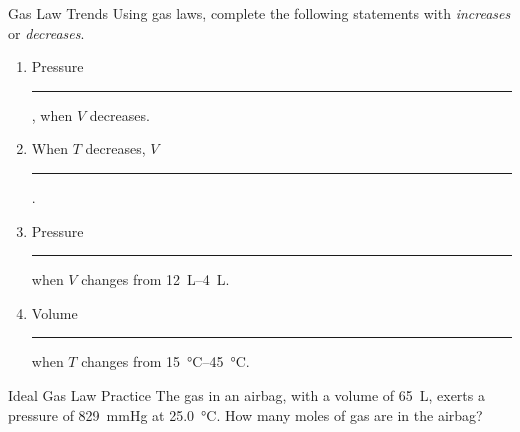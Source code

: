 \documentclass[handout]{beamer}
\begin{document}
\begin{frame}[t]{Gas Law Trends}
	Using gas laws, complete the following statements with \emph{increases}
	or \emph{decreases}.

	\begin{enumerate}
		\item Pressure \rule{6em}{0.4pt}, when $V$ decreases.
		\item When $T$ decreases, $V$ \rule{6em}{0.4pt}.
		\item Pressure \rule{6em}{0.4pt} when $V$ changes from
			\SIrange{12}{4}{\liter}.
		\item Volume \rule{6em}{0.4pt} when $T$ changes from
			\SIrange{15}{45}{\celsius}.
	\end{enumerate}
\end{frame}



\begin{frame}[t]{Ideal Gas Law Practice }
	The  gas in an airbag, with a volume of \SI{65}{\liter}, exerts a
	pressure of \SI{829}{\mmHg} at \SI{25.0}{\celsius}. How many moles of
	 gas are in the airbag?

	\vfill

\end{frame}
\end{document}
